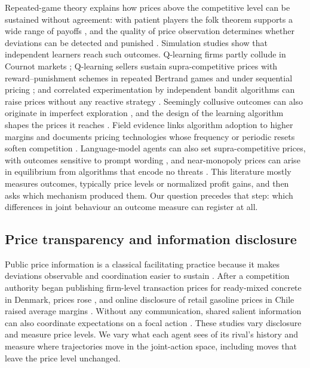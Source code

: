 \documentclass[sigconf,review,anonymous]{acmart}
\begin{document}
Repeated-game theory explains how prices above the competitive level can be sustained without agreement: with patient players the folk theorem supports a wide range of payoffs \cite{fudenberg1986folk}, and the quality of price observation determines whether deviations can be detected and punished \cite{stigler1964theory,green1984noncooperative}. Simulation studies show that independent learners reach such outcomes. Q-learning \cite{watkins1992qlearning} firms partly collude in Cournot markets \cite{waltman2008qlearning}; Q-learning sellers sustain supra-competitive prices with reward--punishment schemes in repeated Bertrand games \cite{calvano2020ai} and under sequential pricing \cite{klein2021autonomous}; and correlated experimentation by independent bandit algorithms can raise prices without any reactive strategy \cite{hansen2021frontiers}. Seemingly collusive outcomes can also originate in imperfect exploration \cite{abada2023artificial}, and the design of the learning algorithm shapes the prices it reaches \cite{asker2022artificial}. Field evidence links algorithm adoption to higher margins \cite{assad2024algorithmic} and documents pricing technologies whose frequency or periodic resets soften competition \cite{brown2023competition,musolff2022algorithmic}. Language-model agents can also set supra-competitive prices, with outcomes sensitive to prompt wording \cite{fish2024algorithmic}, and near-monopoly prices can arise in equilibrium from algorithms that encode no threats \cite{arunachaleswaran2025without}. This literature mostly measures outcomes, typically price levels or normalized profit gains, and then asks which mechanism produced them. Our question precedes that step: which differences in joint behaviour an outcome measure can register at all.

\subsection{Price transparency and information disclosure}

Public price information is a classical facilitating practice because it makes deviations observable and coordination easier to sustain \cite{salop1986practices}. After a competition authority began publishing firm-level transaction prices for ready-mixed concrete in Denmark, prices rose \cite{albaek1997government}, and online disclosure of retail gasoline prices in Chile raised average margins \cite{luco2019who}. Without any communication, shared salient information can also coordinate expectations on a focal action \cite{schelling1960strategy}. These studies vary disclosure and measure price levels. We vary what each agent sees of its rival's history and measure where trajectories move in the joint-action space, including moves that leave the price level unchanged.
\end{document}
